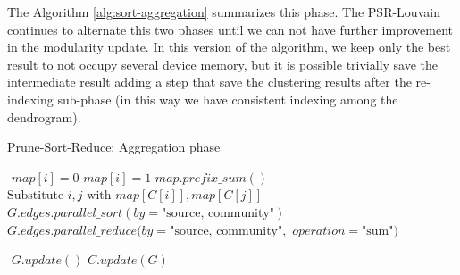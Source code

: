 The Algorithm \ref{alg:sort-aggregation} summarizes this phase. 
The PSR-Louvain continues to alternate this two phases until we can not have further improvement in the modularity update. In this version of the algorithm, we keep only the best result to not occupy several device memory, but it is possible trivially save the intermediate result adding a step that save the clustering results after the re-indexing sub-phase (in this way we have consistent indexing among the dendrogram).
\begin{algorithm}
	\caption{Prune-Sort-Reduce: Aggregation phase}\label{alg:sort-aggregation}
	\begin{algorithmic}
		\State $ $
		\State $map[i] = 0$
		\Else
		\State $map[i] = 1$
		\EndIf
		\EndFor 
		\State $map.prefix\_sum()$
		\State $ $
			\State $\text{Substitute } i , j \text{ with } map[C[i]], map[C[j]]$
		\EndFor 
		\State $ $
		\State $G.edges.parallel\_sort(by= \text{"source, community"})$
		\State $G.edges.parallel\_reduce(by= \text{"source, community"}, $
		\Statex[9] $operation= \text{"sum"})$

		\State $ $
		\State $G.update()$
		\State $C.update(G)$	
		\EndProcedure
	\end{algorithmic}
\end{algorithm}
\newpage
